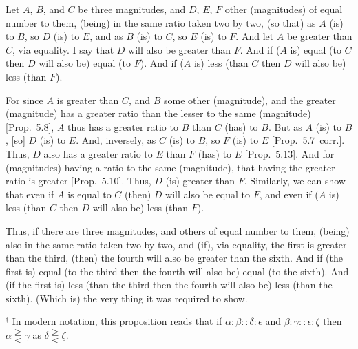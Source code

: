 \begin{Parallel}{}{}
{\epsfysize=0.7in
\centerline{}

Let $A$, $B$, and $C$ be three magnitudes, and $D$, $E$, $F$ other (magnitudes) of equal
number to them, (being) in the same ratio taken two by two, (so that)
as $A$ (is) to $B$, so $D$ (is) to $E$, and as $B$ (is) to $C$, so $E$ (is) to $F$. And let $A$
be greater than $C$, via equality. I say that $D$ will also be greater
than $F$. And if ($A$ is) equal (to $C$ then $D$ will also be) equal (to $F$). And
if ($A$ is) less (than $C$ then $D$ will also be) less (than $F$).

For since $A$ is greater than $C$, and $B$ some other (magnitude), and
the greater (magnitude) has a greater ratio than the lesser to the same (magnitude) [Prop.~5.8], $A$ thus has
a greater ratio to $B$ than $C$ (has) to $B$. But as $A$ (is) to $B$, [so] $D$ (is)
to $E$. And, inversely, as $C$ (is) to $B$,  so  $F$ (is) to $E$ [Prop.~5.7~corr.]. Thus, $D$ also has a greater
ratio to $E$ than $F$ (has) to $E$ [Prop.~5.13]. And for (magnitudes) having a ratio to the
same (magnitude), that having the greater ratio is greater [Prop.~5.10]. Thus, $D$ (is) greater than $F$.
Similarly, we can show that even if $A$ is equal to $C$ (then) $D$ will also
be equal to $F$, and even if ($A$ is) less (than $C$ then $D$ will also
be) less (than $F$).

Thus, if there are three magnitudes, and others of equal
number to them,   (being) also in the same ratio taken two by two, and (if),
via equality, the first is greater
than the third, (then) the fourth will also be greater than the sixth. And
 if (the first is) equal (to the third then the fourth will also be) equal
(to the sixth). And (if the first is) less (than the third then the fourth will also be) less (than
the sixth). (Which is) the very thing it was required to show.}
\end{Parallel}
{\footnotesize \noindent$^\dag$ In modern notation, this proposition
reads that if $\alpha:\beta::\delta:\epsilon$ and $\beta:\gamma::\epsilon:\zeta$ then $\alpha\gtreqqless\gamma$ as $\delta\gtreqqless\zeta$.}

